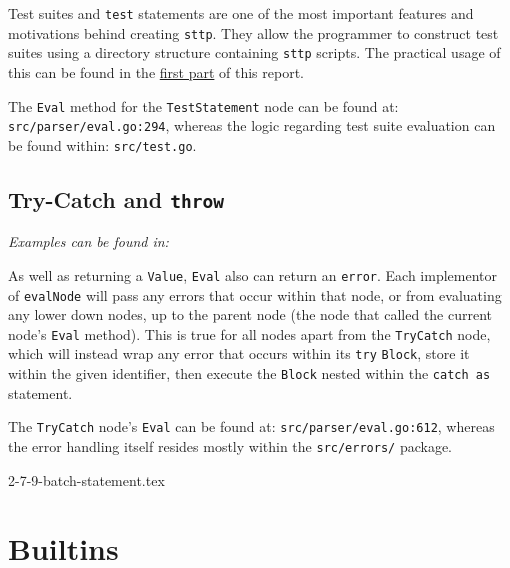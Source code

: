 \documentclass[]{full}
\theoremstyle{definition}
\begin{document}
Test suites and \verb|test| statements are one of the most important features and motivations behind creating \verb|sttp|. They allow the programmer to construct test suites using a directory structure containing \verb|sttp| scripts. The practical usage of this can be found in the \hyperref[sec:hello-sttp-using-sttp-to-test]{first part} of this report.

The \verb|Eval| method for the \verb|TestStatement| node can be found at: \verb|src/parser/eval.go:294|, whereas the logic regarding test suite evaluation can be found within: \verb|src/test.go|.

\cprotect\subsection{Try-Catch and \verb|throw|}

\textit{Examples can be found in: }

As well as returning a \verb|Value|, \verb|Eval| also can return an \texttt{error}. Each implementor of \verb|evalNode| will pass any errors that occur within that node, or from evaluating any lower down nodes, up to the parent node (the node that called the current node's \verb|Eval| method). This is true for all nodes apart from the \verb|TryCatch| node, which will instead wrap any error that occurs within its \verb|try| \verb|Block|, store it within the given identifier, then execute the \verb|Block| nested within the \verb|catch as| statement.

The \verb|TryCatch| node's \verb|Eval| can be found at: \verb|src/parser/eval.go:612|, whereas the error handling itself resides mostly within the \verb|src/errors/| package.

{2-7-9-batch-statement.tex}

\section{Builtins}
\label{sec:development-builtins}
\end{document}
